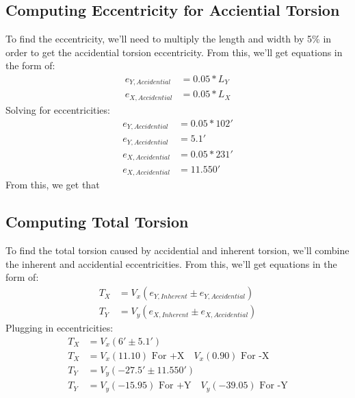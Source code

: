 \documentclass{report} %
\begin{document}
\subsection*{Computing Eccentricity for Acciential Torsion}
To find the eccentricity, we'll need to multiply the length and width by 5\% in order to get the accidential torsion eccentricity. From this, we'll get equations in the form of:
\begin{equation*}
    \begin{aligned}
        e_{Y,Accidential} &= 0.05 * L_Y \\
        e_{X,Accidential} &= 0.05 * L_X 
    \end{aligned}
\end{equation*}
Solving for eccentricities:
\begin{equation*}
    \begin{aligned}
        e_{Y,Accidential} &= 0.05 * 102' \\
        e_{Y,Accidential} &= 5.1' \\
        e_{X,Accidential} &= 0.05 * 231' \\
        e_{X,Accidential} &= 11.550'
    \end{aligned}
\end{equation*}
From this, we get that  \\

\subsection*{Computing Total Torsion}
To find the total torsion caused by accidential and inherent torsion, we'll combine the inherent and accidential eccentricities. From this, we'll get equations in the form of:
\begin{equation*}
    \begin{aligned}
        T_X &= V_x (e_{Y,Inherent} \pm e_{Y,Accidential}) \\
        T_Y &= V_y (e_{X,Inherent} \pm e_{X,Accidential}) 
    \end{aligned}
\end{equation*}
Plugging in eccentricities:
\begin{equation*}
    \begin{aligned}
        T_X &= V_x (6' \pm 5.1') \\
        T_X &= V_x (11.10) \text{ For +X} \quad V_x (0.90) \text{ For -X} \\
        T_Y &= V_y (-27.5' \pm 11.550') \\
        T_Y &= V_y (-15.95) \text{ For +Y} \quad V_y (-39.05) \text{ For -Y}
    \end{aligned}
\end{equation*}
\end{document}
